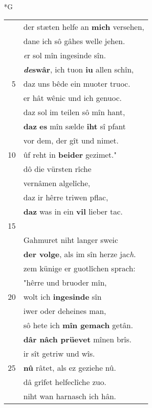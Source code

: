 \documentclass[8pt,a4paper,notitlepage]{article}
\begin{document}
\newpage
\begin{table}[ht]
\begin{minipage}[t]{0.5\linewidth}
\small
\begin{center}*G
\end{center}
\begin{tabular}{rl}
 & der stæten helfe an \textbf{mich} versehen,\\ 
 & dane ich sô gâhes welle jehen.\\ 
 & \textit{e}r sol mîn ingesinde sîn.\\ 
 & \textbf{\textit{de}swâr}, ich tuon \textbf{iu} allen schîn,\\ 
5 & daz uns bêde ein muoter truoc.\\ 
 & er hât wênic und ich genuoc.\\ 
 & daz sol im teilen sô mîn hant,\\ 
 & \textbf{daz} \textbf{es} mîn sælde \textbf{iht} sî pfant\\ 
 & vor dem, der gît und nimet.\\ 
10 & ûf reht in \textbf{beider} gezimet."\\ 
 & dô die vürsten rîche\\ 
 & vernâmen algelîche,\\ 
 & daz ir hêrre triwen pflac,\\ 
 & \textbf{daz} was in ein \textbf{vil} lieber tac.\\ 
15 & \textbf{\begin{large}I\end{large}egelîcher} im \textbf{sunder} neic.\\ 
 & Gahmuret niht langer sweic\\ 
 & \textbf{der volge}, als im sîn herze jac\textit{h}.\\ 
 & zem künige er guotlîchen sprach:\\ 
 & "hêrre und bruoder mîn,\\ 
20 & wolt ich \textbf{ingesinde} sîn\\ 
 & iwer oder deheines man,\\ 
 & sô hete ich \textbf{mîn gemach} getân.\\ 
 & \textbf{dâr nâch prüevet} mînen brîs.\\ 
 & ir sît getriw und wîs.\\ 
25 & \textbf{nû} râtet, als ez geziehe nû.\\ 
 & dâ grîfet helfeclîche zuo.\\ 
 & niht wan harnasch ich hân.\\ 

\end{tabular}
\end{minipage}
\end{table}
\end{document}
